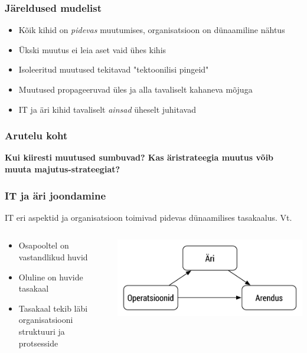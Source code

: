 \begin{frame}[fragile]
  \frametitle{Järeldused mudelist}
	\begin{itemize}
		\item Kõik kihid on \emph{pidevas} muutumises, organisatsioon on dünaamiline nähtus
		\item Ükski muutus ei leia aset vaid ühes kihis
		\item Isoleeritud muutused tekitavad "tektoonilisi pingeid"
		\item Muutused propageeruvad üles ja alla tavaliselt kahaneva mõjuga
		\item IT ja äri kihid tavaliselt \emph{ainsad} üheselt juhitavad
	\end{itemize}
\end{frame}

\begin{frame}[fragile]
  \frametitle{Arutelu koht}
		\begin{center}
			\textbf{Kui kiiresti muutused sumbuvad? Kas äristrateegia muutus võib muuta majutus-strateegiat?}
		\end{center}
\end{frame}

\begin{frame}[fragile]
  \frametitle{IT ja äri joondamine}
  IT eri aspektid ja organisatsioon toimivad pidevas dünaamilises tasakaalus. Vt. \cite{luftman2004assessing}
	\begin{columns}[t]
		\begin{column}{6cm}
			\begin{itemize}
				\item Osapooltel on vastandlikud huvid
				\item Oluline on huvide tasakaal
				\item Tasakaal tekib läbi organisatsiooni struktuuri ja protsesside
			\end{itemize}
		\end{column}
		\begin{column}[T]{5cm}
			\includegraphics[width=\textwidth]{alignment.pdf}
		\end{column}
	\end{columns}
\end{frame}

